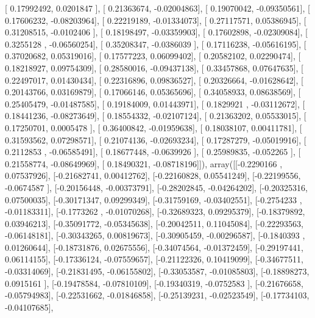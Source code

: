 \documentclass{article}
\begin{document}
       [ 0.17992492,  0.0201847 ],
       [ 0.21363674, -0.02004863],
       [ 0.19070042, -0.09350561],
       [ 0.17606232, -0.08203964],
       [ 0.22219189, -0.01334073],
       [ 0.27117571,  0.05386945],
       [ 0.31208515, -0.0102406 ],
       [ 0.18198497, -0.03359903],
       [ 0.17602898, -0.02309084],
       [ 0.3255128 , -0.06560254],
       [ 0.35208347, -0.0386039 ],
       [ 0.17116238, -0.05616195],
       [ 0.37020682,  0.05319016],
       [ 0.17577223,  0.06099402],
       [ 0.20582102,  0.02290474],
       [ 0.18218927,  0.09754309],
       [ 0.28580016, -0.09437138],
       [ 0.33457868,  0.07647635],
       [ 0.22497017,  0.01430434],
       [ 0.22316896,  0.09836527],
       [ 0.20326664, -0.01628642],
       [ 0.20143766,  0.03169879],
       [ 0.17066146,  0.05365696],
       [ 0.34058933,  0.08638569],
       [ 0.25405479, -0.01487585],
       [ 0.19184009,  0.01443971],
       [ 0.1829921 , -0.03112672],
       [ 0.18441236, -0.08273649],
       [ 0.18554332, -0.02107124],
       [ 0.21363202,  0.05533015],
       [ 0.17250701,  0.0005478 ],
       [ 0.36400842, -0.01959638],
       [ 0.18038107,  0.00411781],
       [ 0.31593562,  0.07298571],
       [ 0.21074136, -0.02693234],
       [ 0.17287279, -0.05019916],
       [ 0.2112853 , -0.06585491],
       [ 0.18677448, -0.0639926 ],
       [ 0.25989835, -0.052265  ],
       [ 0.21558774, -0.08649969],
       [ 0.18490321, -0.08718196]]), array([[-0.2290166 ,  0.07537926],
       [-0.21682741,  0.00412762],
       [-0.22160828,  0.05541249],
       [-0.22199556, -0.0674587 ],
       [-0.20156448, -0.00373791],
       [-0.28202845, -0.04264202],
       [-0.20325316,  0.07500035],
       [-0.30171347,  0.09299349],
       [-0.31759169, -0.03402551],
       [-0.2754233 , -0.01183311],
       [-0.1773262 , -0.01070268],
       [-0.32689323,  0.09295379],
       [-0.18379892,  0.03946213],
       [-0.35091772, -0.05345638],
       [-0.20042511,  0.11045084],
       [-0.22293563, -0.06148181],
       [-0.30343265,  0.00819673],
       [-0.30905459, -0.00296587],
       [-0.1840393 ,  0.01260644],
       [-0.18731876,  0.02675556],
       [-0.34074564, -0.01372459],
       [-0.29197441,  0.06114155],
       [-0.17336124, -0.07559657],
       [-0.21122326,  0.10419099],
       [-0.34677511, -0.03314069],
       [-0.21831495, -0.06155802],
       [-0.33053587, -0.01085803],
       [-0.18898273,  0.0915161 ],
       [-0.19478584, -0.07810109],
       [-0.19340319, -0.0752583 ],
       [-0.21676658, -0.05794983],
       [-0.22531662, -0.01846858],
       [-0.25139231, -0.02523549],
       [-0.17734103, -0.04107685],
\end{document}
